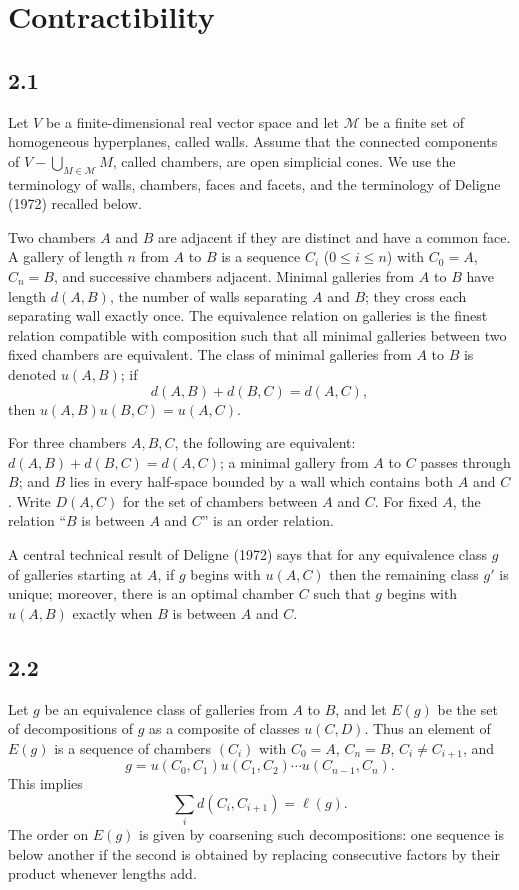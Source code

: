 \documentclass[11pt]{article}
\begin{document}
\section{Contractibility}

\subsection*{2.1}
Let $V$ be a finite-dimensional real vector space and let $\mathcal M$ be a finite set of homogeneous hyperplanes, called walls. Assume that the connected components of $V-\bigcup_{M\in\mathcal M}M$, called chambers, are open simplicial cones. We use the terminology of walls, chambers, faces and facets, and the terminology of Deligne (1972) recalled below.

Two chambers $A$ and $B$ are adjacent if they are distinct and have a common face. A gallery of length $n$ from $A$ to $B$ is a sequence $C_i$ ($0\le i\le n$) with $C_0=A$, $C_n=B$, and successive chambers adjacent. Minimal galleries from $A$ to $B$ have length $d(A,B)$, the number of walls separating $A$ and $B$; they cross each separating wall exactly once. The equivalence relation on galleries is the finest relation compatible with composition such that all minimal galleries between two fixed chambers are equivalent. The class of minimal galleries from $A$ to $B$ is denoted $u(A,B)$; if
\[
d(A,B)+d(B,C)=d(A,C),
\]
then $u(A,B)u(B,C)=u(A,C)$.

For three chambers $A,B,C$, the following are equivalent: $d(A,B)+d(B,C)=d(A,C)$; a minimal gallery from $A$ to $C$ passes through $B$; and $B$ lies in every half-space bounded by a wall which contains both $A$ and $C$. Write $D(A,C)$ for the set of chambers between $A$ and $C$. For fixed $A$, the relation ``$B$ is between $A$ and $C$'' is an order relation.

A central technical result of Deligne (1972) says that for any equivalence class $g$ of galleries starting at $A$, if $g$ begins with $u(A,C)$ then the remaining class $g'$ is unique; moreover, there is an optimal chamber $C$ such that $g$ begins with $u(A,B)$ exactly when $B$ is between $A$ and $C$.

\subsection*{2.2}
Let $g$ be an equivalence class of galleries from $A$ to $B$, and let $E(g)$ be the set of decompositions of $g$ as a composite of classes $u(C,D)$. Thus an element of $E(g)$ is a sequence of chambers $(C_i)$ with $C_0=A$, $C_n=B$, $C_i\ne C_{i+1}$, and
\begin{equation}
g=u(C_0,C_1)u(C_1,C_2)\cdots u(C_{n-1},C_n).
\tag{2.2.1}
\end{equation}
This implies
\begin{equation}
\sum_i d(C_i,C_{i+1})=\ell(g).\tag{2.2.2}
\end{equation}
The order on $E(g)$ is given by coarsening such decompositions: one sequence is below another if the second is obtained by replacing consecutive factors by their product whenever lengths add.
\end{document}

